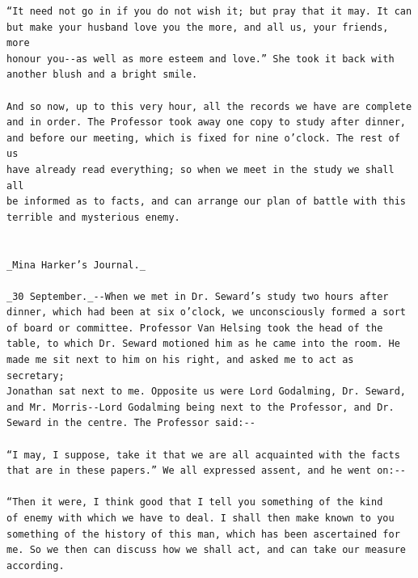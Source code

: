 \documentclass{article}
\begin{document}
\begin{verbatim}
“It need not go in if you do not wish it; but pray that it may. It can
but make your husband love you the more, and all us, your friends, more
honour you--as well as more esteem and love.” She took it back with
another blush and a bright smile.

And so now, up to this very hour, all the records we have are complete
and in order. The Professor took away one copy to study after dinner,
and before our meeting, which is fixed for nine o’clock. The rest of us
have already read everything; so when we meet in the study we shall all
be informed as to facts, and can arrange our plan of battle with this
terrible and mysterious enemy.


_Mina Harker’s Journal._

_30 September._--When we met in Dr. Seward’s study two hours after
dinner, which had been at six o’clock, we unconsciously formed a sort
of board or committee. Professor Van Helsing took the head of the
table, to which Dr. Seward motioned him as he came into the room. He
made me sit next to him on his right, and asked me to act as secretary;
Jonathan sat next to me. Opposite us were Lord Godalming, Dr. Seward,
and Mr. Morris--Lord Godalming being next to the Professor, and Dr.
Seward in the centre. The Professor said:--

“I may, I suppose, take it that we are all acquainted with the facts
that are in these papers.” We all expressed assent, and he went on:--

“Then it were, I think good that I tell you something of the kind
of enemy with which we have to deal. I shall then make known to you
something of the history of this man, which has been ascertained for
me. So we then can discuss how we shall act, and can take our measure
according.


\end{verbatim}
\end{document}
